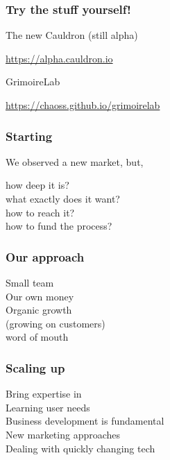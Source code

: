 \documentclass[17pt,aspectratio=169,hyperref=pdfusetitle]{beamer}
\begin{document}
\begin{frame}[fragile]
  \frametitle{Try the stuff yourself!}

  The new Cauldron (still alpha)

  \begin{flushright}
    \url{https://alpha.cauldron.io}
  \end{flushright}

  GrimoireLab

  \begin{flushright}
    \url{https://chaoss.github.io/grimoirelab}
  \end{flushright}
  

\end{frame}

\begin{frame}[fragile]
  \frametitle{Starting}

  We observed a new market, but,

  \begin{flushright}
  how deep it is? \\
  what exactly does it want? \\
  how to reach it? \\
  how to fund the process? \\
  \end{flushright}
  
\end{frame}

\begin{frame}[fragile]
  \frametitle{Our approach}

  Small team \\
  Our own money \\
  Organic growth \\
  (growing on customers) \\
  word of mouth \\
  
\end{frame}

\begin{frame}[fragile]
  \frametitle{Scaling up}

  Bring expertise in \\
  Learning user needs \\
  Business development is fundamental \\
  New marketing approaches \\
  Dealing with quickly changing tech \\
  
\end{frame}
\end{document}
